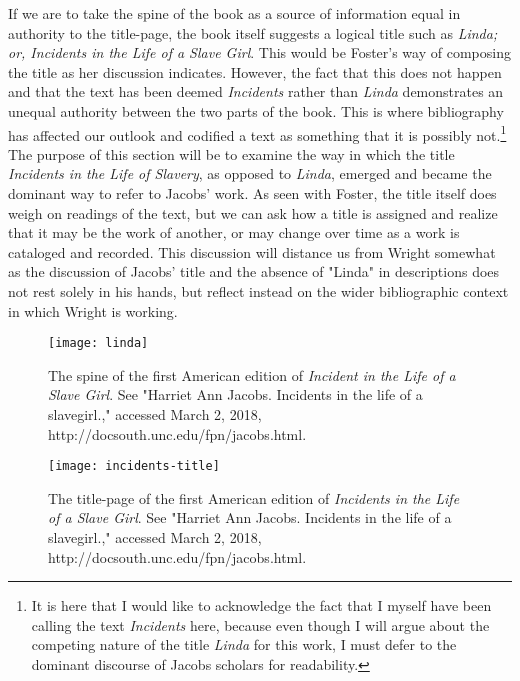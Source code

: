 If we are to take the spine of the book as a source of information equal in authority to the title-page, the book itself suggests a logical title such as \textit{Linda; or, Incidents in the Life of a Slave Girl}. This would be Foster's way of composing the title as her discussion indicates. However, the fact that this does not happen and that the text has been deemed \textit{Incidents} rather than \textit{Linda} demonstrates an unequal authority between the two parts of the book. This is where bibliography has affected our outlook and codified a text as something that it is possibly not.\footnote{It is here that I would like to acknowledge the fact that I myself have been calling the text \textit{Incidents} here, because even though I will argue about the competing nature of the title \textit{Linda} for this work, I must defer to the dominant discourse of Jacobs scholars for readability.}  The purpose of this section will be to examine the way in which the title \textit{Incidents in the Life of Slavery}, as opposed to \textit{Linda}, emerged and became the dominant way to refer to Jacobs' work. As seen with Foster, the title itself does weigh on readings of the text, but we can ask how a title is assigned and realize that it may be the work of another, or may change over time as a work is cataloged and recorded. This discussion will distance us from Wright somewhat as the discussion of Jacobs' title and the absence of "Linda" in descriptions does not rest solely in his hands, but reflect instead on the wider bibliographic context in which Wright is working. 

\begin{figure}
\texttt{[image: linda]}
\caption{The spine of the first American edition of \textit{Incident in the Life of a Slave Girl}. See "Harriet Ann Jacobs. Incidents in the life of a slavegirl.," accessed March 2, 2018, http://docsouth.unc.edu/fpn/jacobs.html.}
\end{figure}

\begin{figure}
\texttt{[image: incidents-title]}
\caption{The title-page of the first American edition of \textit{Incidents in the Life of a Slave Girl}. See "Harriet Ann Jacobs. Incidents in the life of a slavegirl.," accessed March 2, 2018, http://docsouth.unc.edu/fpn/jacobs.html.}
\end{figure}

